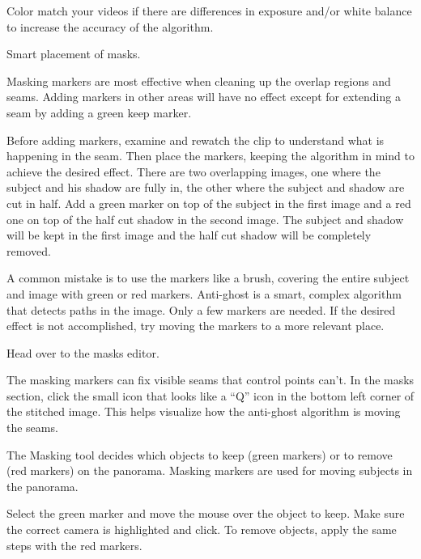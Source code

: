 \begin{fullwidth}
\tip Color match your videos if there are differences in exposure and/or white balance to increase the accuracy of the algorithm.

{\large Smart placement of masks. \par}

Masking markers are most effective when cleaning up the overlap regions and seams. Adding markers in other areas will have no effect except for extending a seam by adding a green keep marker. 

Before adding markers, examine and rewatch the clip to understand what is happening in the seam. Then place the markers, keeping the algorithm in mind to achieve the desired effect. There are two overlapping images, one where the subject and his shadow are fully in, the other where the subject and shadow are cut in half. Add a green marker on top of the subject in the first image and a red one on top of the half cut shadow in the second image. The subject and shadow will be kept in the first image and the half cut shadow will be completely removed. 


A common mistake is to use the markers like a brush, covering the entire subject and image with green or red markers. Anti-ghost is a smart, complex algorithm that detects paths in the image. Only a few markers are needed. If the desired effect is not accomplished, try moving the markers to a more relevant place. 


Head over to the masks editor.


The masking markers can fix visible seams that control points can’t. In the masks section, click the small icon that looks like a “Q” icon in the bottom left corner of the stitched image. This helps visualize how the anti-ghost algorithm is moving the seams.


The Masking tool decides which objects to keep (green markers) or to remove (red markers) on the panorama. Masking markers are used for moving subjects in the panorama.

Select the green marker and move the mouse over the object to keep. Make sure the correct camera is highlighted and click. To remove objects, apply the same steps with the red markers.



\end{fullwidth}

